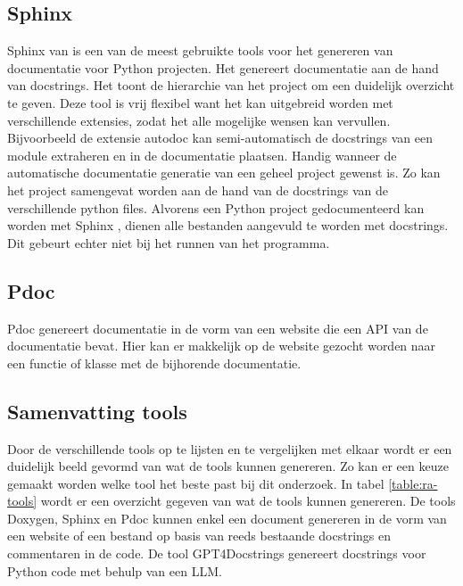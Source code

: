 \subsection{Sphinx}
Sphinx van \textcite{Sphinx2023} is een van de meest gebruikte tools voor het genereren van documentatie voor Python projecten.
Het genereert documentatie aan de hand van docstrings. Het toont de hierarchie van het project om een duidelijk overzicht te geven.
Deze tool is vrij flexibel want het kan uitgebreid worden met verschillende extensies, zodat het alle mogelijke wensen kan vervullen.
Bijvoorbeeld de extensie autodoc kan semi-automatisch de docstrings van een module extraheren en in de documentatie plaatsen. 
Handig wanneer de automatische documentatie generatie van een geheel project gewenst is. Zo kan het project samengevat worden aan de hand van de docstrings van de verschillende python files. 
Alvorens een Python project gedocumenteerd kan worden met Sphinx \autocite{Sphinx2023}, dienen alle bestanden aangevuld te worden met docstrings.
Dit gebeurt echter niet bij het runnen van het programma.

\subsection{Pdoc}
Pdoc \autocite{GallantHils2023} genereert documentatie in de vorm van een website die een API van de documentatie bevat. 
Hier kan er makkelijk op de website gezocht worden naar een functie of klasse met de bijhorende documentatie.

\begin{table}[h!]
\centering
{}
\caption{Vergelijking documentatie tools}
\label{table:vgl-tools}
\end{table}

\subsection{Samenvatting tools}
\label{sec:samenvatting-tools}
Door de verschillende tools op te lijsten en te vergelijken met elkaar wordt er een duidelijk beeld gevormd van wat de tools kunnen genereren.
Zo kan er een keuze gemaakt worden welke tool het beste past bij dit onderzoek.
In tabel \ref{table:ra-tools} wordt er een overzicht gegeven van wat de tools kunnen genereren.
De tools Doxygen, Sphinx en Pdoc kunnen enkel een document genereren in de vorm van een website of een bestand op basis van reeds bestaande docstrings en commentaren in de code.
De tool GPT4Docstrings genereert docstrings voor Python code met behulp van een LLM.

